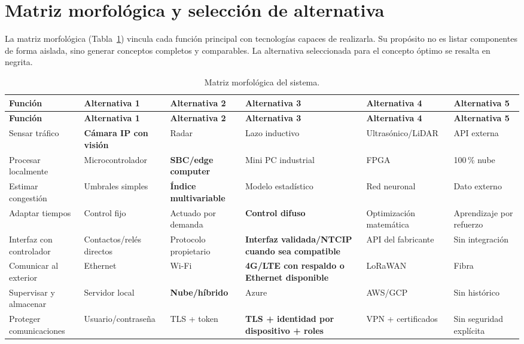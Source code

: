 \section{Matriz morfológica y selección de alternativa}\label{sec:matriz-morfologica}

La matriz morfológica (Tabla~\ref{tab:matriz-morfologica}) vincula cada función principal con tecnologías
capaces de realizarla. Su propósito no es listar componentes de forma aislada, sino generar conceptos
completos y comparables. La alternativa seleccionada para el concepto óptimo se resalta en negrita.

\begin{landscape}
\footnotesize
\begin{longtable}{@{}p{3.8cm}p{3.8cm}p{3.8cm}p{3.8cm}p{3.8cm}p{3.8cm}@{}}
\caption{Matriz morfológica del sistema.}\label{tab:matriz-morfologica}\\
\toprule
\textbf{Función} & \textbf{Alternativa 1} & \textbf{Alternativa 2} & \textbf{Alternativa 3} & \textbf{Alternativa 4} & \textbf{Alternativa 5}\\
\midrule
\endfirsthead
\toprule
\textbf{Función} & \textbf{Alternativa 1} & \textbf{Alternativa 2} & \textbf{Alternativa 3} & \textbf{Alternativa 4} & \textbf{Alternativa 5}\\
\midrule
\endhead
\bottomrule
\endfoot
Sensar tráfico & \textbf{Cámara IP con visión} & Radar & Lazo inductivo & Ultrasónico/LiDAR & API externa\\
Procesar localmente & Microcontrolador & \textbf{SBC/edge computer} & Mini PC industrial & FPGA & 100\,\% nube\\
Estimar congestión & Umbrales simples & \textbf{Índice multivariable} & Modelo estadístico & Red neuronal & Dato externo\\
Adaptar tiempos & Control fijo & Actuado por demanda & \textbf{Control difuso} & Optimización matemática & Aprendizaje por refuerzo\\
Interfaz con controlador & Contactos/relés directos & Protocolo propietario & \textbf{Interfaz validada/NTCIP cuando sea compatible} & API del fabricante & Sin integración\\
Comunicar al exterior & Ethernet & Wi-Fi & \textbf{4G/LTE con respaldo o Ethernet disponible} & LoRaWAN & Fibra\\
Supervisar y almacenar & Servidor local & \textbf{Nube/híbrido} & Azure & AWS/GCP & Sin histórico\\
Proteger comunicaciones & Usuario/contraseña & TLS + token & \textbf{TLS + identidad por dispositivo + roles} & VPN + certificados & Sin seguridad explícita\\

\end{longtable}
\end{landscape}
